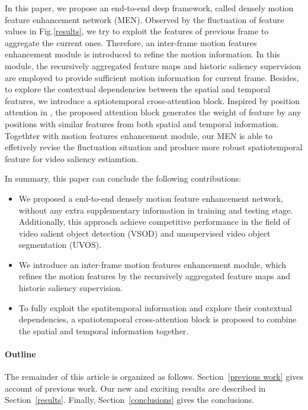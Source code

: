 \documentclass[12pt]{article}
\begin{document}
In this paper, we propose an end-to-end deep framework, called densely motion feature enhancement network (MEN). Observed by the fluctuation of feature values in Fig.\ref{results}, we try to exploit the features of previous frame to aggregate the current ones. Therefore, an inter-frame motion features enhancement module is introduced to refine the motion information. In this module, the recursively aggregated feature maps and historic saliency supervision are employed to provide sufficient motion information for current frame. Besides, to explore the contextual dependencies between the spatial and temporal features, we introduce a sptiotemporal cross-attention block. Inspired by position attention in \cite{}, the proposed attention block generates the weight of feature by any positions with similar features from both spatial and temporal information. Togethter with motion features enhancement module, our MEN is able to effetively revise the fluctuation situation and produce more robust spatiotemporal feature for video saliency estiamtion.

In summary, this paper can conclude the following contributions:

\begin{itemize}
  \item We proposed a end-to-end densely motion feature enhancement network, without any extra supplementary information in training and testing stage. Additionally, this approach achieve competitive performance in the field of video salient object detection (VSOD) and unsupervised video object segmentation (UVOS). 
  \item We introduce an inter-frame motion features enhancement module, which refines the motion features by the recursively aggregated feature maps and historic saliency supervision.
  \item To fully exploit the spatitemporal information and explore their contextual dependencies, a spatiotemporal cross-attention block is proposed to combine the spatial and temporal information together.	  
\end{itemize}
  
\paragraph{Outline}
The remainder of this article is organized as follows.
Section~\ref{previous work} gives account of previous work.
Our new and exciting results are described in Section~\ref{results}.
Finally, Section~\ref{conclusions} gives the conclusions.
\end{document}
